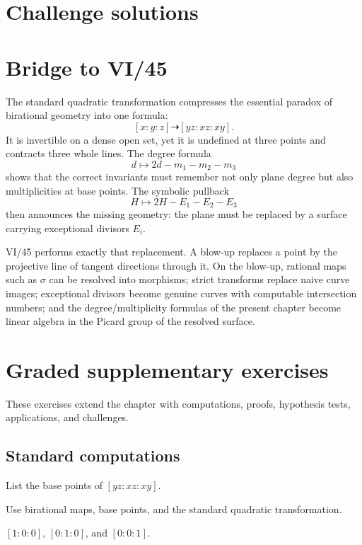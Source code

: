 \ifdefined\IncludeChallengeSolutions
\section{Challenge solutions}

\fi

\section*{Bridge to VI/45}

The standard quadratic transformation compresses the essential paradox of birational geometry into one formula:
\[
  [x:y:z]\dashrightarrow[yz:xz:xy].
\]
It is invertible on a dense open set, yet it is undefined at three points and contracts three whole lines.  The degree formula
\[
  d\longmapsto2d-m_1-m_2-m_3
\]
shows that the correct invariants must remember not only plane degree but also multiplicities at base points.  The symbolic pullback
\[
  H\longmapsto2H-E_1-E_2-E_3
\]
then announces the missing geometry: the plane must be replaced by a surface carrying exceptional divisors \(E_i\).

VI/45 performs exactly that replacement.  A blow-up replaces a point by the projective line of tangent directions through it.  On the blow-up, rational maps such as \(\sigma\) can be resolved into morphisms; strict transforms replace naive curve images; exceptional divisors become genuine curves with computable intersection numbers; and the degree/multiplicity formulas of the present chapter become linear algebra in the Picard group of the resolved surface.
\section{Graded supplementary exercises}
These exercises extend the chapter with computations, proofs, hypothesis tests, applications, and challenges.

\subsection*{Standard computations}

\begin{exercise}\label{exr:vi44-expand-01}
List the base points of $[yz:xz:xy]$.
\end{exercise}
\begin{hint}
Use birational maps, base points, and the standard quadratic transformation.
\end{hint}
\begin{solution}
$[1:0:0]$, $[0:1:0]$, and $[0:0:1]$.
\end{solution}

